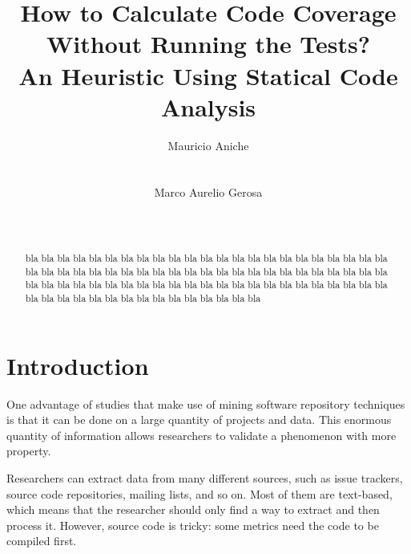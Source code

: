 \documentclass{sig-alternate}
\begin{document}

\title{How to Calculate Code Coverage\\
Without Running the Tests?\\
An Heuristic Using Statical Code Analysis}


\author{
\alignauthor
Mauricio Aniche\\
\\
\\
\alignauthor
Marco Aurelio Gerosa\\
\\
\\
}

\maketitle
\begin{abstract}

bla bla bla bla bla bla bla bla bla bla bla bla bla bla bla bla bla bla bla bla bla bla bla bla
bla bla bla bla bla bla bla bla bla bla bla bla
bla bla bla bla bla bla bla bla bla bla bla bla
bla bla bla bla bla bla bla bla bla bla bla bla
bla bla bla bla bla bla bla bla bla bla bla bla
bla bla bla bla bla bla bla bla bla bla bla bla


\end{abstract}

\section{Introduction}

One advantage of studies that make use of mining software repository techniques
is that it can be done on a large quantity of projects and data. This enormous 
quantity of information allows researchers to validate a phenomenon with more
property.

Researchers can extract data from many different sources, such as issue trackers,
source code repositories, mailing lists, and so on. Most of them are text-based, which
means that the researcher should only find a way to extract and then process it. 
However, source code is tricky: some metrics need the code to be compiled first.
\end{document}
